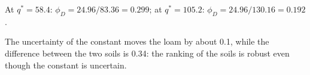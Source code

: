 \sol
\par\noindent At $q^*=58.4$: $\phi_D=24.96/83.36=0.299$; at $q^*=105.2$: $\phi_D=24.96/130.16=0.192$.\finans
\par\noindent The uncertainty of the constant moves the loam by about 0.1, while the difference between the two soils is 0.34: the ranking of the soils is robust even though the constant is uncertain.
